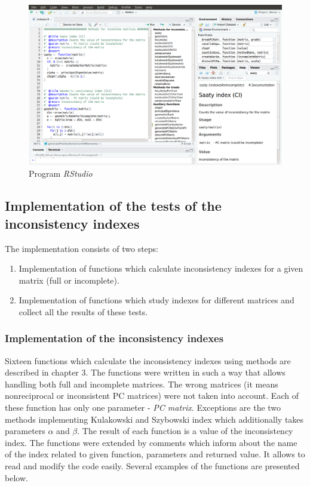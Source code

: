 \begin{figure}[!]
\centerline{\includegraphics[width=\textwidth]{images/rstudio.png}}
\caption{Program \textit{RStudio}}
\label{fig:rstudio}
\end{figure}

\subsection{Implementation of the tests of the inconsistency indexes}
The implementation consists of two steps:
\begin{enumerate}
  \item Implementation of functions which calculate inconsistency indexes for a given matrix (full or incomplete).
  \item Implementation of functions which study indexes for different matrices and collect all the results of these tests. 
\end{enumerate}

\subsubsection{Implementation of the inconsistency indexes}
Sixteen functions which calculate the inconsistency indexes using methods are described in chapter 3. The functions were written in such a way that allows handling both full and incomplete matrices. The wrong matrices (it means nonreciprocal or inconsistent PC matrices) were not taken into account. Each of these function has only one parameter - \textit{PC matrix}. Exceptions are the two methods implementing Kulakowski and Szybowski index which additionally takes parameters $\alpha$ and $\beta$. The result of each function is a value of the inconsistency index. The functions were extended by comments which inform about the name of the index related to given function, parameters and returned value. It allows to read and modify the code easily. Several examples of the functions are presented below.


